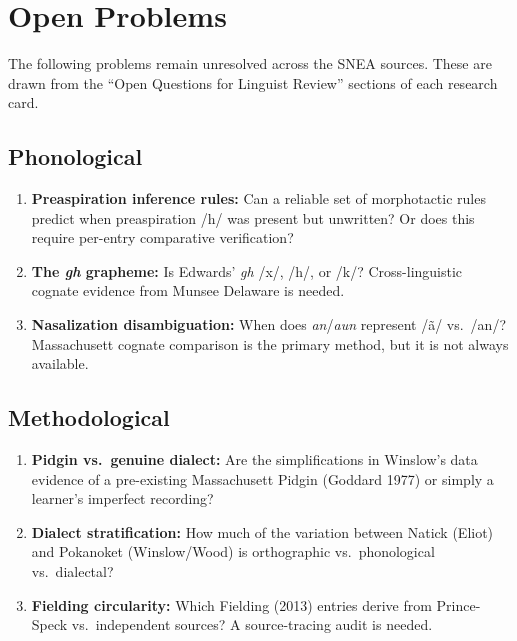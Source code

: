
\section{Open Problems}
\label{sec:open-questions}

The following problems remain unresolved across the SNEA sources. These are
drawn from the ``Open Questions for Linguist Review'' sections of each
research card.

\subsection{Phonological}

\begin{enumerate}
  \item \textbf{Preaspiration inference rules:} Can a reliable set of
    morphotactic rules predict when preaspiration /h/ was present but
    unwritten? Or does this require per-entry comparative verification?
  \item \textbf{The \textit{gh} grapheme:} Is Edwards' \textit{gh} /x/, /h/,
    or /k/? Cross-linguistic cognate evidence from Munsee Delaware is needed.
  \item \textbf{Nasalization disambiguation:} When does \textit{an}/\textit{aun}
    represent /ã/ vs.\ /an/? Massachusett cognate comparison is the primary
    method, but it is not always available.
\end{enumerate}

\subsection{Methodological}

\begin{enumerate}
  \item \textbf{Pidgin vs.\ genuine dialect:} Are the simplifications in
    Winslow's data evidence of a pre-existing Massachusett Pidgin (Goddard
    1977) or simply a learner's imperfect recording?
  \item \textbf{Dialect stratification:} How much of the variation between
    Natick (Eliot) and Pokanoket (Winslow/Wood) is orthographic vs.\
    phonological vs.\ dialectal?
  \item \textbf{Fielding circularity:} Which Fielding (2013) entries derive
    from Prince-Speck vs.\ independent sources? A source-tracing audit is
    needed.
\end{enumerate}

